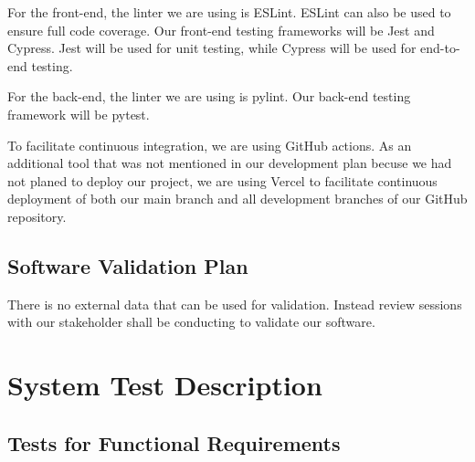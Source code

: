 \documentclass[12pt, titlepage]{article}
\begin{document}
For the front-end, the linter we are using is ESLint. ESLint can also be used to ensure full code coverage. Our front-end testing frameworks will be Jest and Cypress. Jest will be used for unit testing, while Cypress will be used for end-to-end testing.

For the back-end, the linter we are using is pylint. Our back-end testing framework will be pytest.

To facilitate continuous integration, we are using GitHub actions. As an additional tool that was not mentioned in our development plan becuse we had not planed to deploy our project, we are using Vercel to facilitate continuous deployment of both our main branch and all development branches of our GitHub repository.

\subsection{Software Validation Plan}

There is no external data that can be used for validation. Instead review sessions with our stakeholder shall be conducting to validate our software.




\section{System Test Description}
	
\subsection{Tests for Functional Requirements}


\end{document}

